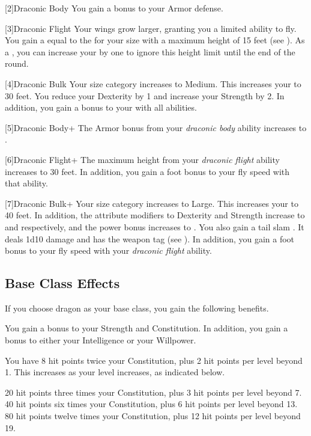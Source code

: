     [2]{Draconic Body} You gain a  bonus to your Armor defense.

      [3]{Draconic Flight} Your wings grow larger, granting you a limited ability to fly.
      You gain a  equal to the  for your size with a maximum height of 15 feet (see ).
      As a , you can increase your  by one to ignore this height limit until the end of the round.

    [4]{Draconic Bulk} Your size category increases to Medium.
      This increases your  to 30 feet.
      You reduce your Dexterity by 1 and increase your Strength by 2.
      In addition, you gain a  bonus to your  with all abilities.

    [5]{Draconic Body+} The Armor bonus from your \textit{draconic body} ability increases to .

      [6]{Draconic Flight+} The maximum height from your \textit{draconic flight} ability increases to 30 feet.
      In addition, you gain a  foot bonus to your fly speed with that ability.

    [7]{Draconic Bulk+} Your size category increases to Large.
      This increases your  to 40 feet.
      In addition, the attribute modifiers to Dexterity and Strength increase to  and  respectively, and the power bonus increases to .
      You also gain a tail slam .
      It deals 1d10 damage and has the  weapon tag (see ).
      In addition, you gain a  foot bonus to your fly speed with your \textit{draconic flight} ability.

  \subsection{Base Class Effects}
    If you choose dragon as your base class, you gain the following benefits.

     You gain a  bonus to your Strength and Constitution. In addition, you gain a  bonus to either your Intelligence or your Willpower.

      You have 8 hit points \add twice your Constitution, plus 2 hit points per level beyond 1.
      This increases as your level increases, as indicated below.
      \begin{itemize}
         20 hit points \add three times your Constitution, plus 3 hit points per level beyond 7.
         40 hit points \add six times your Constitution, plus 6 hit points per level beyond 13.
         80 hit points \add twelve times your Constitution, plus 12 hit points per level beyond 19.
      \end{itemize}

